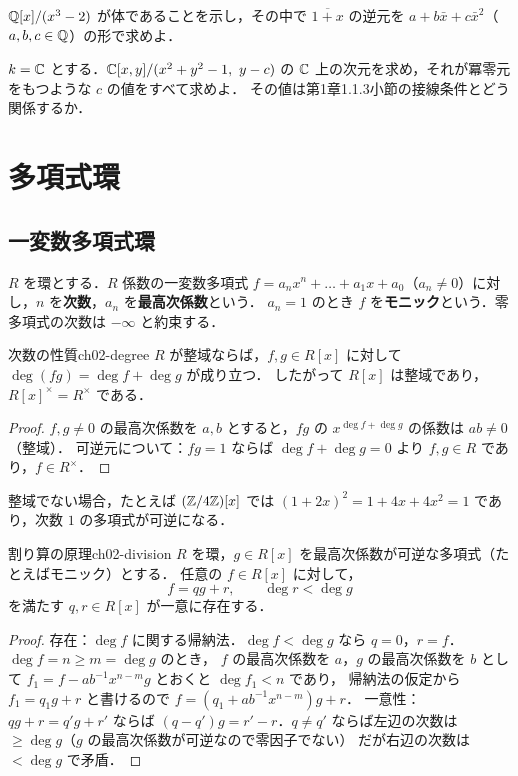 $\mathbb{Q}[x]/(x^3-2)$ が体であることを示し，その中で $\overline{1+x}$ の逆元を $a+b\bar x+c\bar x^2$（$a,b,c\in\mathbb{Q}$）の形で求めよ．

$k=\mathbb{C}$ とする．$\mathbb{C}[x,y]/(x^2+y^2-1,\ y-c)$ の $\mathbb{C}$ 上の次元を求め，それが冪零元をもつような $c$ の値をすべて求めよ．
その値は第1章1.1.3小節の接線条件とどう関係するか．

\section{多項式環}

\subsection{一変数多項式環}

$R$ を環とする．$R$ 係数の一変数多項式 $f=a_nx^n+\dots+a_1x+a_0$（$a_n\ne0$）に対し，$n$ を\textbf{次数}，$a_n$ を\textbf{最高次係数}という．
$a_n=1$ のとき $f$ を\textbf{モニック}という．零多項式の次数は $-\infty$ と約束する．

\begin{myprop}{次数の性質}{ch02-degree}
$R$ が整域ならば，$f,g\in R[x]$ に対して $\deg(fg)=\deg f+\deg g$ が成り立つ．
したがって $R[x]$ は整域であり，$R[x]^\times=R^\times$ である．
\end{myprop}

\begin{proof}
$f,g\ne0$ の最高次係数を $a,b$ とすると，$fg$ の $x^{\deg f+\deg g}$ の係数は $ab\ne0$（整域）．
可逆元について：$fg=1$ ならば $\deg f+\deg g=0$ より $f,g\in R$ であり，$f\in R^\times$．
\end{proof}

整域でない場合，たとえば $(\mathbb{Z}/4\mathbb{Z})[x]$ では $(1+2x)^2=1+4x+4x^2=1$ であり，次数 $1$ の多項式が可逆になる．

\begin{mythm}{割り算の原理}{ch02-division}
$R$ を環，$g\in R[x]$ を最高次係数が可逆な多項式（たとえばモニック）とする．
任意の $f\in R[x]$ に対して，
\[
  f=qg+r,\qquad \deg r<\deg g
\]
を満たす $q,r\in R[x]$ が一意に存在する．
\end{mythm}

\begin{proof}
存在：$\deg f$ に関する帰納法．$\deg f<\deg g$ なら $q=0$，$r=f$．$\deg f=n\ge m=\deg g$ のとき，
$f$ の最高次係数を $a$，$g$ の最高次係数を $b$ として $f_1=f-ab^{-1}x^{n-m}g$ とおくと $\deg f_1<n$ であり，
帰納法の仮定から $f_1=q_1g+r$ と書けるので $f=(q_1+ab^{-1}x^{n-m})g+r$．
一意性：$qg+r=q'g+r'$ ならば $(q-q')g=r'-r$．$q\ne q'$ ならば左辺の次数は $\ge\deg g$（$g$ の最高次係数が可逆なので零因子でない）
だが右辺の次数は $<\deg g$ で矛盾．
\end{proof}

